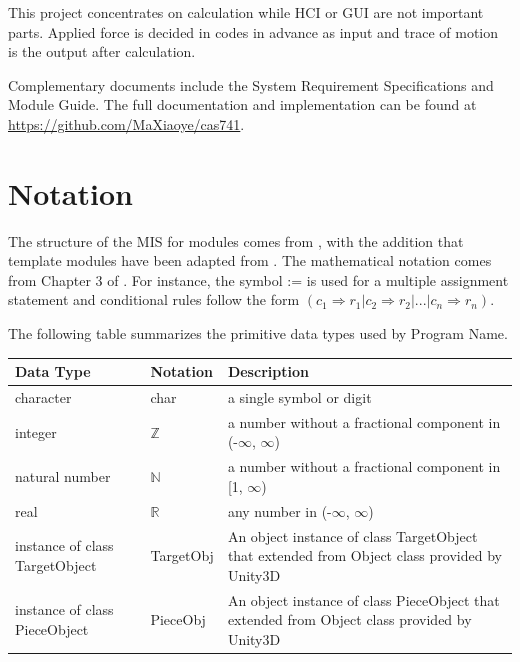 \documentclass[12pt, titlepage]{article}
\newcommand{\progname}{Program Name}
\begin{document}
This project concentrates on calculation while
HCI or GUI are not important parts. Applied force is decided in codes in advance as input
and trace of motion is the output after calculation.

Complementary documents include the System Requirement Specifications
and Module Guide.  The full documentation and implementation can be
found at \url{https://github.com/MaXiaoye/cas741}.

\section{Notation}


The structure of the MIS for modules comes from \citet{HoffmanAndStrooper1995},
with the addition that template modules have been adapted from
\cite{GhezziEtAl2003}.  The mathematical notation comes from Chapter 3 of
\citet{HoffmanAndStrooper1995}.  For instance, the symbol := is used for a
multiple assignment statement and conditional rules follow the form $(c_1
\Rightarrow r_1 | c_2 \Rightarrow r_2 | ... | c_n \Rightarrow r_n )$.

The following table summarizes the primitive data types used by \progname. 

\begin{center}
\renewcommand{\arraystretch}{1.2}
\noindent 
\begin{tabular}{l l p{7.5cm}} 
\toprule 
\textbf{Data Type} & \textbf{Notation} & \textbf{Description}\\ 
\midrule
character & char & a single symbol or digit\\
integer & $\mathbb{Z}$ & a number without a fractional component in (-$\infty$, $\infty$) \\
natural number & $\mathbb{N}$ & a number without a fractional component in [1, $\infty$) \\
real & $\mathbb{R}$ & any number in (-$\infty$, $\infty$)\\
instance of class TargetObject & TargetObj & An object instance of class TargetObject that extended from Object class provided by Unity3D\\
instance of class PieceObject & PieceObj & An object instance of class PieceObject that extended from Object class provided by Unity3D\\
\bottomrule
\end{tabular} 
\end{center}
\end{document}
